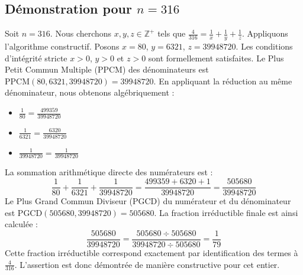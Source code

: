 \documentclass[11pt,a4paper]{article}
\begin{document}
\subsection{Démonstration pour $n = 316$}
Soit $n = 316$. Nous cherchons $x, y, z \in \mathbb{Z}^{+}$ tels que $\frac{4}{316} = \frac{1}{x} + \frac{1}{y} + \frac{1}{z}$.
Appliquons l'algorithme constructif. Posons $x = 80$, $y = 6321$, $z = 39948720$.
Les conditions d'intégrité stricte $x > 0$, $y > 0$ et $z > 0$ sont formellement satisfaites.
Le Plus Petit Commun Multiple (PPCM) des dénominateurs est $\text{PPCM}(80, 6321, 39948720) = 39948720$.
En appliquant la réduction au même dénominateur, nous obtenons algébriquement :
\begin{itemize}
    \item $\frac{1}{80} = \frac{499359}{39948720}$
    \item $\frac{1}{6321} = \frac{6320}{39948720}$
    \item $\frac{1}{39948720} = \frac{1}{39948720}$
\end{itemize}
La sommation arithmétique directe des numérateurs est :
$$ \frac{1}{80} + \frac{1}{6321} + \frac{1}{39948720} = \frac{499359 + 6320 + 1}{39948720} = \frac{505680}{39948720} $$
Le Plus Grand Commun Diviseur (PGCD) du numérateur et du dénominateur est $\text{PGCD}(505680, 39948720) = 505680$.
La fraction irréductible finale est ainsi calculée :
$$ \frac{505680}{39948720} = \frac{505680 \div 505680}{39948720 \div 505680} = \frac{1}{79} $$
Cette fraction irréductible correspond exactement par identification des termes à $\frac{4}{316}$. L'assertion est donc démontrée de manière constructive pour cet entier.
\end{document}
